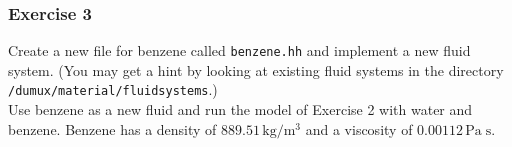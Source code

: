 \subsubsection{Exercise 3}

Create a new file for benzene called \texttt{benzene.hh} and implement
a new fluid system. (You may get a hint by looking at existing fluid 
systems in the directory \verb+/dumux/material/fluidsystems+.) \\
Use benzene as a new fluid and run the model of Exercise 2 with water
and benzene. Benzene has a density of $889.51 \, \text{kg} / \text{m}^3$
and a viscosity of $0.00112 \, \text{Pa} \; \text{s}$. 


